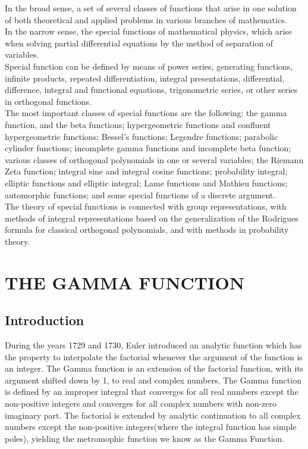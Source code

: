 \documentclass[11pt]{report}
\begin{document}
	In the broad sense, a set of several classes of functions that arise in one solution of both theoretical and applied problems in various branches of mathematics.\\
	
	In the narrow sense, the special functions of mathematical physics, which arise when solving partial differential equations by the method of separation of variables.\\
	
	Special function can be defined by means of power series, generating functions, infinite products, repeated differentiation, integral presentations, differential, difference, integral and functional equations, trigonometric series, or other series in orthogonal functions.\\
	
	The most important classes of special functions are the following: the gamma function, and the beta functions; hypergeometric functions and confluent hypergeometric functions; Bessel's functions; Legendre functions; parabolic cylinder functions; incomplete gamma functions and incomplete beta function; various classes of orthogonal polynomials in one or several variables; the Riemann Zeta function; integral sine and integral cosine functions; probability integral; elliptic functions and elliptic integral; Lame functions and Mathieu functions; automorphic functions; and some special functions of a discrete argument.\\
	
	The theory of special functions is connected with group representations, with methods of integral representations based on the generalization of the Rodrigues formula for classical orthogonal polynomials, and with methods in probability theory.

	
	\chapter{THE GAMMA FUNCTION}
	
	\section{Introduction}
	During the years 1729 and 1730, Euler introduced an analytic function which has the property to interpolate the factorial whenever the argument of the function is an integer. The Gamma function is an extension of the factorial function, with its argument shifted down by 1, to real and complex numbers. The Gamma function is defined by an improper integral that converges for all real numbers except the non-positive integers and converges for all complex numbers with non-zero imaginary part. The factorial is extended by analytic continuation to all complex numbers except the non-positive integers(where the integral function has simple poles), yielding the metromophic function we know as the Gamma Function.\\
	
\end{document}

